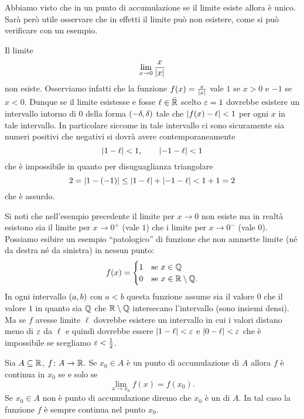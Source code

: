 Abbiamo visto che in un punto di accumulazione se il limite 
esiste allora è unico.
Sarà però utile osservare che in effetti il limite può non 
esistere, come si può verificare con un esempio.

\begin{example}
Il limite 
\[
  \lim_{x\to 0} \frac{x}{{\left|x\right|}}
\]
non esiste. 
Osserviamo infatti che la funzione $f(x) = \frac{x}{{\left|x\right|}}$ 
vale $1$ se $x>0$ e $-1$ se $x<0$.
Dunque se il limite esistesse e fosse $\ell\in \bar {\mathbb R}$ 
scelto $\varepsilon=1$ dovrebbe esistere un intervallo intorno di $0$ 
della forma $\left(-\delta,\delta\right)$ tale che 
${\left|f(x)-\ell\right|}<1$ per ogni $x$ in tale intervallo.
In particolare siccome in tale intervallo ci sono sicuramente 
sia numeri positivi che negativi si dovrà avere 
contemporaneamente
\[
  {\left|1-\ell\right|}<1, \qquad 
  {\left|-1-\ell\right|}<1  
\]
che è impossibile in quanto per disuguaglianza triangolare 
\[
 2 = {\left|1-(-1)\right|} 
 \le {\left|1-\ell\right|} + {\left|-1-\ell\right|}
 < 1 + 1 = 2
\]
che è assurdo.
\end{example}

Si noti che nell'esempio precedente il limite per $x\to 0$ 
non esiste ma in realtà esistono sia il limite per $x\to 0^+$ 
(vale $1$) che i limite per $x\to 0^-$ (vale $0$).
Possiamo esibire un esempio ``patologico'' di funzione 
che non ammette limite (né da destra né da sinistra)
in nessun punto:
\[
  f(x) = 
  \begin{cases}
     1 & \text{se $x\in \mathbb Q$}\\ 
     0 & \text{se $x\in \mathbb R\setminus \mathbb Q$}.
  \end{cases}
\]
In ogni intervallo $\left(a,b\right)$ con $a<b$ questa funzione 
assume sia il valore $0$ che il valore $1$ 
in quanto sia $\mathbb Q$ che $\mathbb R\setminus \mathbb Q$ intersecano 
l'intervallo (sono insiemi densi).
Ma se $f$ avesse limite $\ell$ dovrebbe esistere un intervallo 
in cui i valori distano meno di $\varepsilon$ da $\ell$ e quindi 
dovrebbe essere ${\left|1-\ell\right|}<\varepsilon$ e ${\left|0-\ell\right|}<\varepsilon$
che è impossibile se scegliamo $\varepsilon < \frac 1 2$.

\begin{theorem}%
\mymark{***}%
  Sia $A\subseteq \mathbb R$, $f\colon A \to \mathbb R$. 
  Se $x_0\in A$ è un punto di accumulazione di $A$
  allora $f$ è continua in $x_0$ se e solo se
  \[
    \lim_{x\to x_0}f(x) = f(x_0).
  \]
  Se $x_0\in A$ non è punto di accumulazione diremo 
  che $x_0$ è un  di $A$.
  In tal caso la funzione $f$ è sempre continua nel punto $x_0$.
\end{theorem}
  

